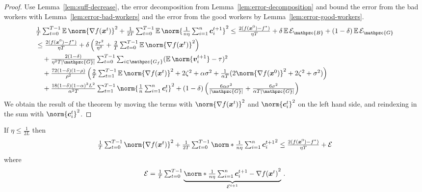 \documentclass{article}
\newcommand{\gset}{\ensuremath{{\mathpzc{G}}}}
\newcommand{\bset}{\ensuremath{{\mathpzc{B}}}}
\newcommand{\gfset}{\ensuremath{{\mathpzc{G_f}}}}
\begin{document}
\begin{proof}
  Use Lemma~\ref{lem:suff-decrease}, the error decomposition from Lemma~\ref{lem:error-decomposition} and bound the error from the bad workers with Lemma~\ref{lem:error-bad-workers} and the error from the good workers by Lemma~\ref{lem:error-good-workers}. 
  \begin{align*}
    &\tfrac{1}{T} \tsum_{t=0}^{T-1} \E \norm{\nabla f(\xx^t)}^2 
     + 
    \tfrac{1}{2T} \tsum_{t=0}^{T-1} \E \norm{\tfrac{1}{n \eta}\tsum_{i=1}^n \cc_i^{t+1}}^2
     \le
    \tfrac{2(f(\xx^0) - f^\ast)}{\eta T} + \delta \E \cE_\bset + (1-\delta) \E \cE_\gset
    \\
     &\le  
    \tfrac{2(f(\xx^0) - f^\ast)}{\eta T}
    + 
    \delta \left(\tfrac{2\tau^2}{\eta^2} + \tfrac{2}{T} \tsum_{t=0}^{T-1} \E \norm{ \nabla f(\xx^t) }^2 \right)
    \\
     & \quad + 
    \tfrac{2(1-\delta)}{\eta^2 T |\gset|} \tsum_{t=0}^{T-1} \tsum_{i\in\gfset} (\E \norm{ \vv_i^{t+1} } - \tau)^2 
    \\
     & \quad + 
    \tfrac{72(1-\delta)(1-\rho)}{\rho^2} 
      \left(      
        \tfrac{2}{T}\tsum_{t=1}^{T-1} \E \norm{\nabla f(\xx^t) }^2
        +  2  \zeta^2
        + \alpha\sigma^2                                             
        + \tfrac{1}{\alpha T}(2\norm{\nabla f(\xx^0) }^2
        + 2 \zeta^2
        + \sigma^2)
      \right)
    \\
     & \quad +
    \tfrac{18(1-\delta)(1-\alpha)^2 L^2}{\alpha^2T} \tsum_{t=1}^{T-1}
    \norm{ \tfrac{1}{n} \tsum_{i=1}^n \cc_i^t }^2
    + (1-\delta) \left(\tfrac{6\alpha\sigma^2}{|\gset|} + \tfrac{6\sigma^2}{\alpha T|\gset|}\right)
  \end{align*}
  We obtain the result of the theorem by moving the terms with $\norm{\nabla f(\xx^t)}^2$ and $\norm{\cc_i^t}^2$ on the left hand side, and reindexing in the sum with $\norm{\cc_i^t}^2$.
\end{proof}


\begin{lemma}\label{lem:suff-decrease}
  If $\eta \le \tfrac{1}{2L}$ then
  \begin{align*}
    \tfrac{1}{T} \tsum_{t=0}^{T-1} \norm{\nabla f(\xx^t)}^2 
     + 
    \tfrac{1}{2T} \tsum_{t=0}^{T-1} \norm*{\tfrac{1}{n \eta}\tsum_{i=1}^n \cc_i^{t+1}}^2
     \leq 
    \tfrac{2(f(\xx^0) - f^\ast)}{\eta T} + \cE
  \end{align*}
  where 
  \begin{align*}
    \cE = \tfrac{1}{T} \tsum_{t=0}^{T-1} \underbrace{ \norm*{\tfrac{1}{n\eta} \tsum_{i=1}^n \cc_i^{t+1} - \nabla f(\xx^t)}^2}_{\cE^{t+1}} \, .
  \end{align*}
\end{lemma}
\end{document}

